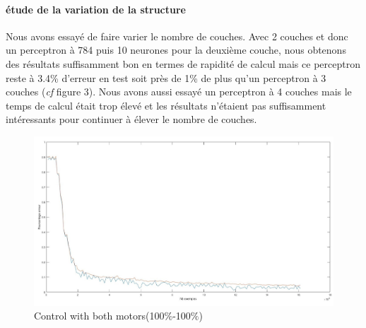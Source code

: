 \documentclass[a4paper,oneside]{report}
\begin{document}
\newpage
\paragraph{étude de la variation de la structure}
Nous avons essayé de faire varier le nombre de couches. Avec 2 couches et donc un perceptron à 784 puis 10 neurones pour la deuxième couche, nous obtenons des résultats suffisamment bon en termes de rapidité de calcul mais ce perceptron reste à 3.4\% d'erreur en test soit près de 1\% de plus qu'un perceptron à 3 couches (\textit{cf} figure 3). Nous avons aussi essayé un perceptron à 4 couches mais le temps de calcul était trop élevé et les résultats n'étaient pas suffisamment intéressants pour continuer à élever le nombre de couches. 

\begin{figure}[!ht]
	\begin{center}
		\includegraphics[scale=0.27]{Images/courbes2couches.jpg} 
		\caption{Control with both motors(100$\%$-100$\%$)} 
	\end{center}
\end{figure}
\end{document}
